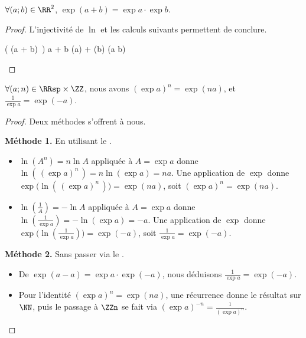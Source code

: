 \begin{fact}
	$\forall (a;b) \in \RR^2$,
	$\exp(a + b) = \exp a \cdot \exp b$.
\end{fact}


\begin{proof}
	L'injectivité de $\ln$ et les calculs suivants permettent de conclure.
	
	\begin{stepcalc}[style=ar*]
		\ln \big( \exp(a + b) \,\big)
		a + b
		\ln(\exp a) + \ln(\exp b)
		\ln(\exp a \cdot \exp b)
	\end{stepcalc}
\end{proof}




\begin{fact} \label{exp-id}
	$\forall (a;n) \in \RRsp \times \ZZ$,
	nous avons
	$(\exp a)^n = \exp(n a)$,
	et
	$\frac{1}{\exp a} = \exp(- a)$.
\end{fact}


\begin{proof}
	Deux méthodes s'offrent à nous.
	
	\smallskip
	\textbf{Méthode 1.} En utilisant le .
	\begin{itemize}
		\item $\ln(A^n) = n \ln A$ appliquée à $A = \exp a$ donne
		$\ln(\,(\exp a)^n\,) = n \ln(\exp a) = n a$.
		Une application de $\exp$ donne
		$\exp\big( \ln(\,(\exp a)^n\,) \big) = \exp(n a)$,
		soit
		$(\exp a)^n = \exp(n a)$.


		\item $\ln(\frac1A) = - \ln A$ appliquée à $A = \exp a$ donne
		$\ln(\frac{1}{\exp a}) = - \ln(\exp a) = - a$.
		Une application de $\exp$ donne
		$\exp\big( \ln(\frac{1}{\exp a}) \big) = \exp(- a)$,
		soit
		$\frac{1}{\exp a} = \exp(- a)$.		
	\end{itemize}

	
	\smallskip
	\textbf{Méthode 2.} Sans passer via le .
	\begin{itemize}
		\item De $\exp(a - a) = \exp a \cdot \exp(- a)$, nous déduisons $\frac{1}{\exp a} = \exp(- a)$.


		\item Pour l'identité $(\exp a)^n = \exp(n a)$, une récurrence donne le résultat sur $\NN$, puis le passage à $\ZZn$ se fait via $(\exp a)^{-n} = \frac{1}{(\exp a)^n}$.
	\end{itemize}
\end{proof}